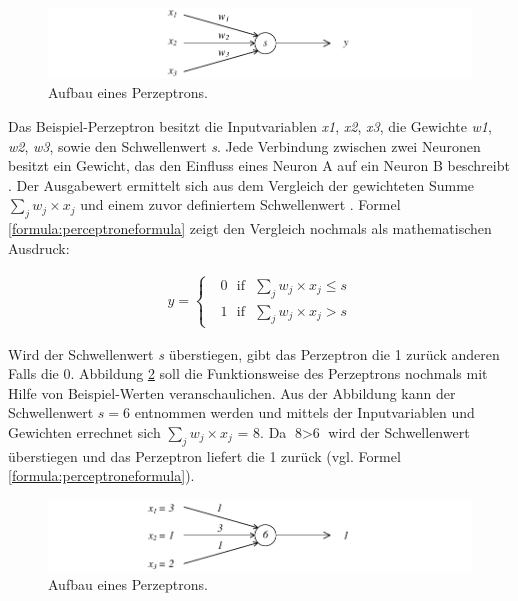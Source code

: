 \begin{figure}[ht]
\centering
\includegraphics{images/perceptron.pdf}
\caption{Aufbau eines Perzeptrons.}
\label{fig:perceptron}
\end{figure}

Das Beispiel-Perzeptron besitzt die Inputvariablen \textit{x1}, \textit{x2}, \textit{x3}, die Gewichte \textit{w1}, \textit{w2}, \textit{w3}, sowie den Schwellenwert \textit{s}. Jede Verbindung zwischen zwei Neuronen besitzt ein Gewicht, das den Einfluss eines Neuron A auf ein Neuron B beschreibt \cite [vgl. S. 86]{EA16}. Der Ausgabewert ermittelt sich aus dem Vergleich der gewichteten Summe $\sum_j w_{j}\times x_{j}$ und einem zuvor definiertem Schwellenwert \cite {HS99, LP87, WE16}. Formel \ref{formula:perceptroneformula} \cite {HS99, WE16} zeigt den Vergleich nochmals als mathematischen Ausdruck:

\begin{align}
\label{formula:perceptroneformula}
y = \begin{cases}\text{ }0\text{ }\text{if}\text{ }\sum_j w_{j}\times x_{j}\leq s\\\text{ }1\text{ }\text{if}\text{ }\sum_j w_{j}\times x_{j}> s\end{cases}
\end{align}

Wird der Schwellenwert \textit{s} überstiegen, gibt das Perzeptron die 1 zurück anderen Falls die 0. Abbildung \ref{fig:perceptronNumbered} soll die Funktionsweise des Perzeptrons nochmals mit Hilfe von Beispiel-Werten veranschaulichen. Aus der Abbildung kann der Schwellenwert $s=6$ entnommen werden und mittels der Inputvariablen und Gewichten errechnet sich $\sum_j w_{j}\times x_{j}\text{ = 8}$. Da $\text{8}>\text{6}$ wird der Schwellenwert überstiegen und das Perzeptron liefert die 1 zurück (vgl. Formel \ref{formula:perceptroneformula}). 

\begin{figure}[ht]
\centering
\includegraphics{images/perceptronNumbered.pdf}
\caption{Aufbau eines Perzeptrons.}
\label{fig:perceptronNumbered}
\end{figure}

